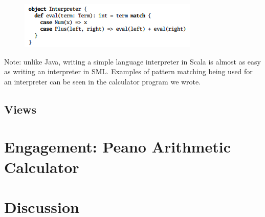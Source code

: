 \documentclass[jou,apacite]{IEEEtran}
\begin{document}
  \begin{figure}[h]
    \centering
    \includegraphics[width=\columnwidth]{pattern_match}
    \caption{}
    \label{fig:example}
  \end{figure}
Note: unlike Java, writing a simple language interpreter in Scala is almost as easy as writing an interpreter in SML. Examples of pattern matching being used for an interpreter can be seen in the calculator program we wrote.

\subsection{Views}







\section{Engagement: Peano Arithmetic Calculator}
\label{sec:engag-peano-arithm}

\section{Discussion}
\label{sec:discussion}
\end{document}
